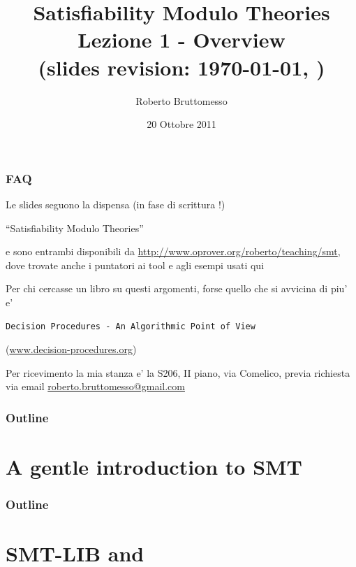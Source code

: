 \documentclass[xcolor=dvipsnames
              ,handout
              ]{beamer}
\title[Overview]{Satisfiability Modulo Theories\\ Lezione 1 - Overview \\ {\tiny (slides revision: \today, \currenttime)}}
\author[R. Bruttomesso]{\large Roberto Bruttomesso}
\date{20 Ottobre 2011}
\institute[SMT]{\large Seminario di Logica Matematica \\(Corso Prof. Silvio Ghilardi)}
\begin{document}
\frame{\titlepage}

\begin{frame}[fragile]
  \frametitle{FAQ}

Le slides seguono la dispensa (in fase di scrittura !)
\begin{center}
``Satisfiability Modulo Theories''
\end{center}
e sono entrambi disponibili da 
\url{http://www.oprover.org/roberto/teaching/smt}, dove
trovate anche i puntatori ai tool e agli esempi usati qui

\vfill
Per chi cercasse un libro su questi argomenti, forse quello che
si avvicina di piu' e'
\begin{verbatim}
Decision Procedures - An Algorithmic Point of View
\end{verbatim}
(\url{www.decision-procedures.org})

\vfill
Per ricevimento la mia stanza e' la S206, II piano, via Comelico,
previa richiesta via email \url{roberto.bruttomesso@gmail.com}

\end{frame}

\begin{frame}
  \frametitle{Outline}
  \tableofcontents
\end{frame}

\section{A gentle introduction to SMT}




\begin{frame}
  \frametitle{Outline}
  \tableofcontents
\end{frame}

\section{SMT-LIB and \smtsolvers}



\end{document}

